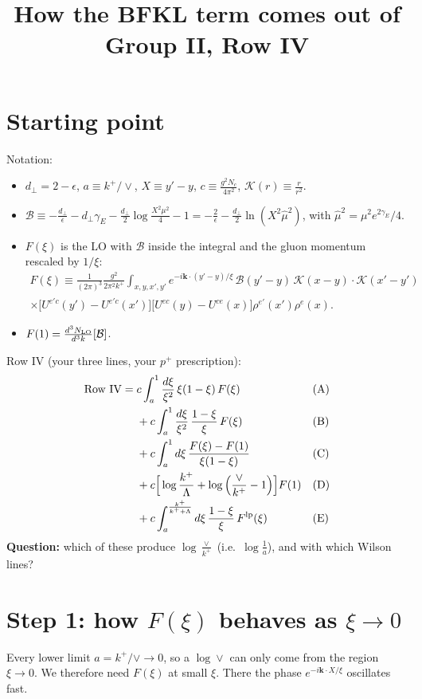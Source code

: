 \documentclass[10pt]{article}
\title{How the BFKL term comes out of Group II, Row IV}
\date{}
\numberwithin{equation}{section}
\newcommand{\NLO}[1]{\frac{d^3N_{#1}}{d^3k}}
\begin{document}
\maketitle

\section{Starting point}
Notation:
\begin{itemize}
\item $d_\perp=2-\epsilon$, $a\equiv k^+/\vee$, $X\equiv y'-y$, $c\equiv\frac{g^2N_c}{4\pi^2}$, $\mathcal K(r)\equiv\frac{r}{r^2}$.
\item $\mathcal B\equiv-\frac{d_\perp}{\epsilon}-d_\perp\gamma_E-\frac{d_\perp}{2}\log\frac{X^2\mu^2}{4}-1=-\frac{2}{\epsilon}-\frac{d_\perp}{2}\ln(X^2\hat\mu^2)$, with $\hat\mu^2=\mu^2e^{2\gamma_E}/4$.
\item $F(\xi)$ is the LO with $\mathcal B$ inside the integral and the gluon momentum rescaled by $1/\xi$:
\begin{multline}
F(\xi)\equiv\frac{1}{(2\pi)^{3}}\frac{g^{2}}{2\pi^{2}k^{+}}\int_{x,y,x',y'}e^{-i\mathbf k\cdot(y'-y)/\xi}\,\mathcal B(y'-y)\,\mathcal K(x-y)\cdot\mathcal K(x'-y')\\
\times\big[U^{e'c}(y')-U^{e'c}(x')\big]\big[U^{ec}(y)-U^{ce}(x)\big]\rho^{e'}(x')\rho^{e}(x).
\end{multline}
\item $F(1)=\NLO{\rm LO}[\mathcal B]$.
\end{itemize}
Row IV (your three lines, your $p^+$ prescription):
\begin{align}
\text{Row IV}={}&c\int_a^1\frac{d\xi}{\xi^2}\,\xi(1-\xi)\,F(\xi)&&\text{(A)}\notag\\
&+c\int_a^1\frac{d\xi}{\xi^2}\,\frac{1-\xi}{\xi}\,F(\xi)&&\text{(B)}\notag\\
&+c\int_a^1d\xi\,\frac{F(\xi)-F(1)}{\xi(1-\xi)}&&\text{(C)}\notag\\
&+c\Big[\log\frac{k^+}{\Lambda}+\log\Big(\frac{\vee}{k^+}-1\Big)\Big]F(1)&&\text{(D)}\notag\\
&+c\int_a^{\frac{k^+}{k^++\Lambda}}d\xi\,\frac{1-\xi}{\xi}\,F^{\rm lp}(\xi)&&\text{(E)}
\end{align}
\textbf{Question:} which of these produce $\log\frac{\vee}{k^+}$ (i.e.\ $\log\frac1a$), and with which Wilson lines?

\section{Step 1: how $F(\xi)$ behaves as $\xi\to0$}
Every lower limit $a=k^+/\vee\to0$, so a $\log\vee$ can only come from the region $\xi\to0$. We therefore need $F(\xi)$ at small $\xi$. There the phase $e^{-i\mathbf k\cdot X/\xi}$ oscillates fast.
\end{document}
